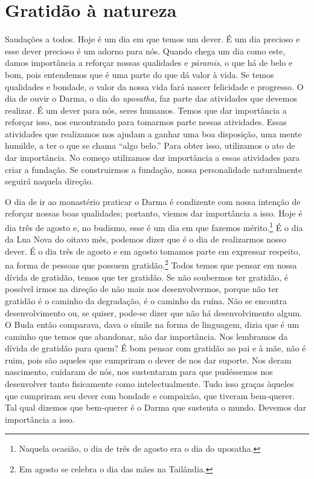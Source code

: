 
\chapter{Gratidão à natureza}
\markright{\theChapterAuthor}

Saudações a todos. Hoje é um dia em que temos um dever. É um dia
precioso e esse dever precioso é um adorno para nós. Quando chega um
dia como este, damos importância a reforçar nossas qualidades e
\textit{pāramīs}, o que há de belo e bom, pois entendemos que é
uma parte do que dá valor à vida. Se temos qualidades e bondade, o
valor da nossa vida fará nascer felicidade e progresso. O dia de ouvir
o Darma, o dia do \textit{uposatha}, faz parte das atividades que
devemos realizar. É um dever para nós, seres humanos. Temos que dar
importância a reforçar isso, nos encontrando para tomarmos parte nessas
atividades. Essas atividades que realizamos nos ajudam a ganhar uma boa
disposição, uma mente humilde, a ter o que se chama “algo belo.” Para
obter isso, utilizamos o ato de dar importância. No começo utilizamos
dar importância a essas atividades para criar a fundação. Se
construirmos a fundação, nossa personalidade naturalmente seguirá
naquela direção. 

O dia de ir ao monastério praticar o Darma é condizente com nossa
intenção de reforçar nossas boas qualidades; portanto, viemos dar
importância a isso. Hoje é dia três de agosto e, no budismo, esse é um
dia em que fazemos mérito.\footnote{Naquela ocasião, o dia de três de
agosto era o dia do uposatha.} É o dia da Lua Nova do oitavo mês,
podemos dizer que é o dia de realizarmos nosso dever. É o dia três de
agosto e em agosto tomamos parte em expressar respeito, na forma de
pessoas que possuem gratidão.\footnote{Em agosto se celebra o dia das
mães na Tailândia.} Todos temos que pensar em nossa dívida de
gratidão, temos que ter gratidão. Se não soubermos ter gratidão, é
possível irmos na direção de não mais nos desenvolvermos, porque não
ter gratidão é o caminho da degradação, é o caminho da ruína. Não se
encontra desenvolvimento ou, se quiser, pode-se dizer que não há
desenvolvimento algum. O Buda então comparava, dava o símile na forma
de linguagem, dizia que é um caminho que temos que abandonar, não dar
importância. Nos lembramos da dívida de gratidão para quem? É bom
pensar com gratidão ao pai e à mãe, não é ruim, pois são aqueles que
cumpriram o dever de nos dar suporte. Nos deram nascimento, cuidaram de
nós, nos sustentaram para que pudéssemos nos desenvolver tanto
fisicamente como intelectualmente. Tudo isso graças àqueles que
cumpriram seu dever com bondade e compaixão, que tiveram bem-querer.
Tal qual dizemos que bem-querer é o Darma que sustenta o mundo. Devemos
dar importância a isso. 

